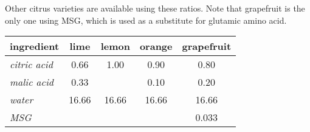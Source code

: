 \begin{variation}
\item Other citrus varieties are available using these ratios\cite{superJuiceKosGrapefruit}\cite{superJuiceKos}.
	Note that grapefruit is the only one using \acrshort{MSG}, which is used as a substitute for glutamic amino acid\cite{superJuiceKosGrapefruitYT}.
	\begin{center}
		\begin{tabular}{lSSSS}\toprule
			\textbf{ingredient}     &  \textbf{lime} & \textbf{lemon} & \textbf{orange} & \textbf{grapefruit} \\ \midrule
			\textit{citric acid}    &           0.66 &           1.00 &            0.90 &                0.80 \\
			\textit{malic acid}     &           0.33 &                &            0.10 &                0.20 \\
			\textit{water}          &          16.66 &          16.66 &           16.66 &               16.66 \\
			\textit{\acrshort{MSG}} &                &                &                 &               0.033 \\ \bottomrule
	\end{tabular}
	\end{center}
\end{variation}


\recipeend%
